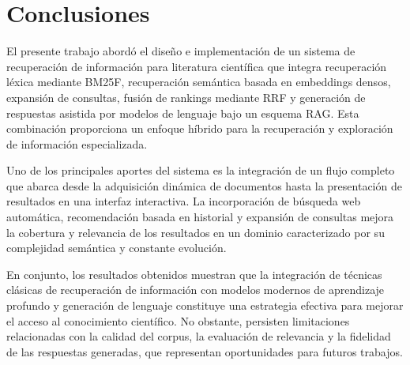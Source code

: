 \documentclass[runningheads]{llncs}
\begin{document}
\section{Conclusiones}

El presente trabajo abordó el diseño e implementación de un sistema de recuperación de información para literatura científica que 
integra recuperación léxica mediante BM25F, recuperación semántica basada en embeddings densos, expansión de consultas, 
fusión de rankings mediante RRF y generación de respuestas asistida por modelos de lenguaje bajo un esquema RAG. 
Esta combinación proporciona un enfoque híbrido para la recuperación y exploración de información especializada.

Uno de los principales aportes del sistema es la integración de un flujo completo que abarca desde la adquisición dinámica de documentos hasta 
la presentación de resultados en una interfaz interactiva. 
La incorporación de búsqueda web automática, recomendación basada en historial y expansión de consultas mejora la cobertura y relevancia de los resultados 
en un dominio caracterizado por su complejidad semántica y constante evolución.

En conjunto, los resultados obtenidos muestran que la integración de técnicas clásicas de recuperación de información con modelos modernos de aprendizaje profundo y 
generación de lenguaje constituye una estrategia efectiva para mejorar el acceso al conocimiento científico. 
No obstante, persisten limitaciones relacionadas con la calidad del corpus, la evaluación de relevancia y la fidelidad de las respuestas generadas, 
que representan oportunidades para futuros trabajos.
\end{document}
